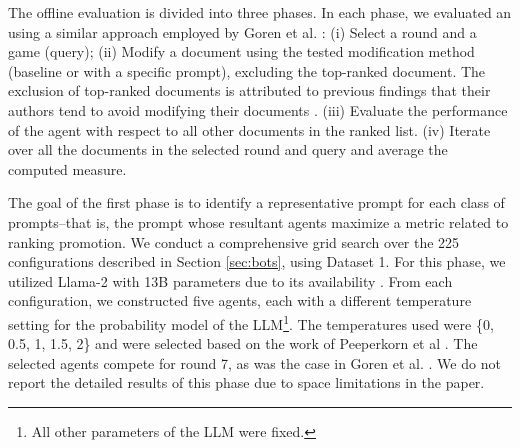 The offline evaluation is divided into three phases. In each phase, we evaluated an \bt{} using a similar approach employed by Goren et al. \cite{goren2020ranking}: (i) Select a round and a game (query); (ii) Modify a document using the tested modification method (baseline \cite{goren2020ranking} or \bt{} with a specific prompt), excluding the top-ranked document. The exclusion of top-ranked documents is attributed to previous findings that their authors tend to avoid modifying their documents \cite{raifer2017information}. (iii) Evaluate the performance of the agent with respect to all other documents in the ranked list. (iv) Iterate over all the documents in the selected round and query and average the computed measure. 


The goal of the first phase is to identify a representative prompt for each class of prompts--that is, the prompt whose resultant agents maximize a metric related to ranking promotion. We conduct a comprehensive grid search over the 225 configurations described in Section \ref{sec:bots}, using Dataset 1. For this phase, we utilized Llama-2 with 13B parameters due to its availability \cite{touvron2023llama}. From each configuration, we constructed five agents, each with a different temperature setting for the probability model of the LLM\footnote{All other parameters of the LLM were fixed.}. The temperatures used were \{0, 0.5, 1, 1.5, 2\} and were selected based on the work of Peeperkorn et al \cite{peeperkorn_is_2024}. The selected agents compete for round 7, as was the case in Goren et al. \cite{goren2020ranking}. We do not report the detailed results of this phase due to space limitations in the paper.


